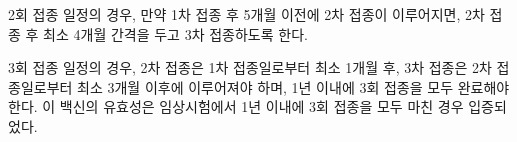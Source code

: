 2회 접종 일정의 경우, 만약 1차 접종 후 5개월 이전에 2차 접종이 이루어지면, 2차 접종 후 최소 4개월 간격을 두고 3차 접종하도록 한다. \par
3회 접종 일정의 경우, 2차 접종은 1차 접종일로부터 최소 1개월 후, 3차 접종은 2차 접종일로부터 최소 3개월 이후에 이루어져야 하며, 1년 이내에 3회 접종을 모두 완료해야 한다. 이 백신의 유효성은 임상시험에서 1년 이내에 3회 접종을 모두 마친 경우 입증되었다.
